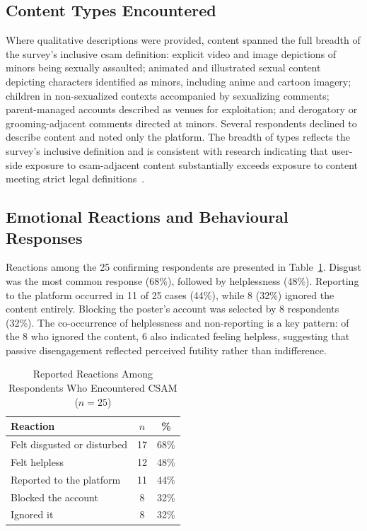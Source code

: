 \documentclass{ieee-portfolio}
\begin{document}
\subsection{Content Types Encountered}
 
Where qualitative descriptions were provided, content spanned the full breadth of the survey's inclusive \gls{csam} definition: explicit video and image depictions of minors being sexually assaulted; animated and illustrated sexual content depicting characters identified as minors, including anime and cartoon imagery; children in non-sexualized contexts accompanied by sexualizing comments; parent-managed accounts described as venues for exploitation; and derogatory or grooming-adjacent comments directed at minors. Several respondents declined to describe content and noted only the platform. The breadth of types reflects the survey's inclusive definition and is consistent with research indicating that user-side exposure to \gls{csam}-adjacent content substantially exceeds exposure to content meeting strict legal definitions~\cite{aic_2022}.
 
\subsection{Emotional Reactions and Behavioural Responses}
 
Reactions among the 25 confirming respondents are presented in Table~\ref{tab:reactions}. Disgust was the most common response (68\%), followed by helplessness (48\%). Reporting to the platform occurred in 11 of 25 cases (44\%), while 8 (32\%) ignored the content entirely. Blocking the poster's account was selected by 8 respondents (32\%). The co-occurrence of helplessness and non-reporting is a key pattern: of the 8 who ignored the content, 6 also indicated feeling helpless, suggesting that passive disengagement reflected perceived futility rather than indifference.
 
\begin{table}[!ht]
\centering
\caption{Reported Reactions Among Respondents Who Encountered CSAM ($n = 25$)}
\label{tab:reactions}
\renewcommand{\arraystretch}{1.2}
\begin{tabular}{lcc}
\toprule
\textbf{Reaction} & \textbf{$n$} & \textbf{\%} \\
\midrule
Felt disgusted or disturbed & 17 & 68\% \\
Felt helpless               & 12 & 48\% \\
Reported to the platform    & 11 & 44\% \\
Blocked the account         & 8  & 32\% \\
Ignored it                  & 8  & 32\% \\
\bottomrule
\end{tabular}
\end{table}
 
\end{document}
